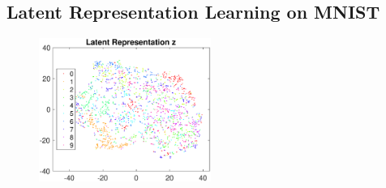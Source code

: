 \documentclass[twoside]{article}
\begin{document}
\subsection{Latent Representation Learning on MNIST}

\begin{figure}[ht]
    \centering
       \includegraphics[width=0.5\textwidth]{fig/z_no_Y.eps}
    \label{fig:z_no_Y}
\end{figure}
 
\end{document}
